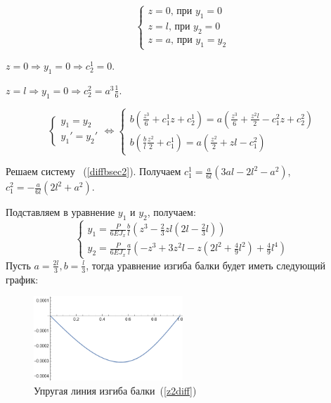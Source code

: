 \documentclass[12pt, a4paper]{article}
\begin{document}
\begin{equation}
	\label{diffbsec}
	\begin{cases}
		z = 0 \mbox{, при } y_1 = 0\\
		z = l \mbox{, при } y_2 = 0\\
		z = a \mbox{, при } y_1 = y_2
	\end{cases}
\end{equation}

$z = 0 \Rightarrow y_1 = 0 \Rightarrow c_2^1 = 0$.

$z = l \Rightarrow y_1 = 0 \Rightarrow c_2^2 = a^3 \frac{1}{6}$.

\begin{equation}
	\label{diffbsec2}
	\begin{cases}
		y_1 = y_2\\
		y_1' = y_2'
	\end{cases}
\Leftrightarrow
	\begin{cases}
	{b} (\frac{z^3}{6} + c_1^1 z + c_2^1) = {a}(\frac{z^3}{6} + \frac{z^2 l}{2} - c_1^2 z + c_2^2)\\
	b(\frac{b}{l} \frac{z^2}{2} + c_1^1) = a(\frac{z^2}{2} + z l - c_1^2)
\end{cases}
\end{equation}

Решаем систему ~(\ref{diffbsec2}). Получаем $c_1^1 = \frac{a}{6 l} (3 a l - 2 l^2 - a^2)$, $c_1^2 = -\frac{a}{6 l} (2 l^2 + a^2)$.

Подставляем в уравнение $y_1$ и $y_2$, получаем:
\begin{equation}
	\label{z2diff}
	\begin{cases}
		y_1 = \frac{P}{6 E J_{x}} \frac{b}{l} (z^3 - \frac{2}{3} z l(2 l - \frac{2}{3}l))\\
		y_2 = \frac{P}{6 E J_{x}} \frac{a}{l} (-z^3 + 3 z^2 l - z(2 l^2 + \frac{4}{9} l^2) + \frac{4}{9}l^4)
	\end{cases}
\end{equation}
Пусть $a = \frac{2 l}{3}, b = \frac{l}{3}$, тогда уравнение изгиба балки будет иметь следующий график:
\begin{figure}[!h]
	\centering
	\includegraphics[width=0.5\textwidth]{g.2}%
	\caption{Упругая линия изгиба балки~(\ref{z2diff})}
	\vspace*{-2mm}
	\label{g2}
\end{figure}
\end{document}
